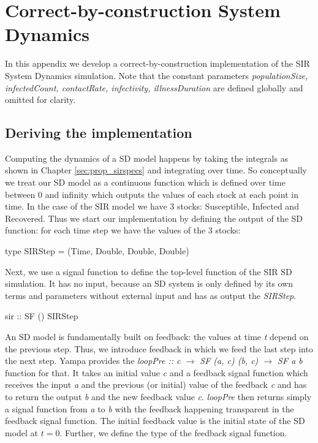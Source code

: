 \chapter{Correct-by-construction System Dynamics}
\label{app:sd_simulation}

In this appendix we develop a correct-by-construction implementation of the SIR System Dynamics simulation. Note that the constant parameters \textit{populationSize, infectedCount, contactRate, infectivity, illnessDuration} are defined globally and omitted for clarity.

\section{Deriving the implementation}
Computing the dynamics of a SD model happens by taking the integrals as shown in Chapter \ref{sec:prop_sirspecs} and integrating over time. So conceptually we treat our SD model as a continuous function which is defined over time between 0 and infinity which outputs the values of each stock at each point in time. In the case of the SIR model we have 3 stocks: Susceptible, Infected and Recovered. Thus we start our implementation by defining the output of the SD function: for each time step we have the values of the 3 stocks:

\begin{HaskellCode}
type SIRStep = (Time, Double, Double, Double)
\end{HaskellCode}

Next, we use a signal function to define the top-level function of the SIR SD simulation. It has no input, because an SD system is only defined by its own terms and parameters without external input and has as output the \textit{SIRStep}.

\begin{HaskellCode}
sir :: SF () SIRStep
\end{HaskellCode}

An SD model is fundamentally built on feedback: the values at time \textit{t} depend on the previous step. Thus, we introduce feedback in which we feed the last step into the next step. Yampa provides the \textit{loopPre :: c $\to$ SF (a, c) (b, c) $\to$ SF a b} function for that. It takes an initial value \textit{c} and a feedback signal function which receives the input \textit{a} and the previous (or initial) value of the feedback \textit{c} and has to return the output \textit{b} and the new feedback value \textit{c}. \textit{loopPre} then returns simply a signal function from \textit{a} to \textit{b} with the feedback happening transparent in the feedback signal function. The initial feedback value is the initial state of the SD model at $t = 0$. Further, we define the type of the feedback signal function.

